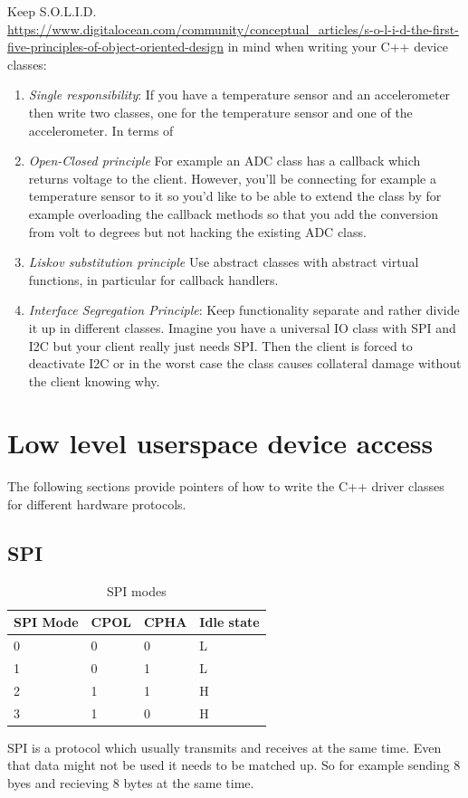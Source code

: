 \documentclass[12pt]{report}
\begin{document}
Keep S.O.L.I.D. \url{https://www.digitalocean.com/community/conceptual_articles/s-o-l-i-d-the-first-five-principles-of-object-oriented-design}
in mind when writing your C++ device classes:
\begin{enumerate}
\item \textsl{Single responsibility}: If you have a temperature
sensor and an accelerometer then write two classes, one for the
temperature sensor and one of the accelerometer. In terms of
\item \textsl{Open-Closed principle} For example an ADC class
  has a callback which returns voltage to the client. However,
  you'll be connecting for example a temperature sensor to
  it so you'd like to be able to extend the class by for example
  overloading the callback methods so that you add the conversion
  from volt to degrees but not hacking the existing ADC class.
\item \textsl{Liskov substitution principle} Use abstract classes
  with abstract virtual functions, in particular for callback
  handlers.
\item \textsl{Interface Segregation Principle}:
  Keep functionality separate and rather divide it up in different
  classes. Imagine you have a universal IO class with SPI and I2C
  but your client really just needs SPI. Then the client is forced
  to deactivate I2C or in the worst case the class causes collateral
  damage without the client knowing why.
\end{enumerate}

\section{Low level userspace device access}
The following sections provide pointers of how to write
the C++ driver classes for different hardware protocols.

\subsection{SPI}
\begin{table}[!ht]
  \begin{center}
  \caption{SPI modes\label{spimodes}}
  \begin{tabular}{l|l|l|l}
    SPI Mode & 	CPOL & 	CPHA & Idle state \\
    \hline
    0& 	0&	0& 	L \\
    1& 	0&	1& 	L \\
    2& 	1&	1& 	H \\
    3& 	1&	0& 	H \\
  \end{tabular}
  \end{center}
\end{table}
SPI is a protocol which usually transmits and receives at the same
time. Even that data might not be used it needs to be matched up. So
for example sending 8 byes and recieving 8 bytes at the same time.
\end{document}
